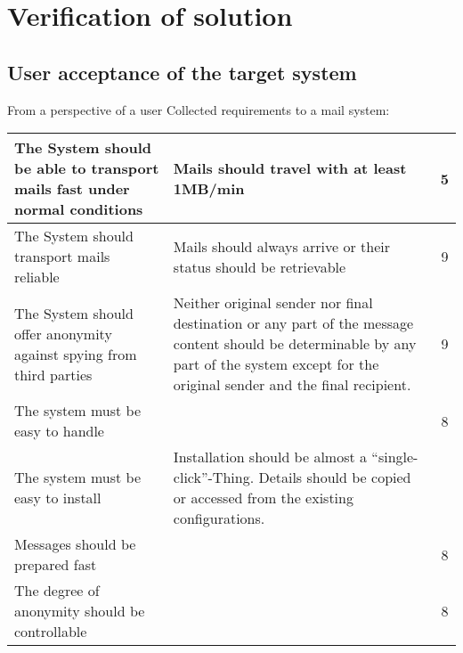 \chapter{Verification of solution}
\section{User acceptance of the target system}
From a perspective of a user 
Collected requirements to a mail system:\par
\begin{center}
\tablelasttail{\hline}
\begin{supertabular}{|p{5cm}|p{5cm}|c|}\hline
The System should be able to transport mails fast under normal conditions & Mails should travel with at least 1MB/min & 5\\\hline
The System should transport mails reliable & Mails should always arrive or their status should be retrievable & 9\\\hline
The System should offer anonymity against spying from third parties & Neither original sender nor final destination or any part of the message content should be determinable by any part of the system except for the original sender and the final recipient.& 9\\\hline
The system must be easy to handle &&8\\\hline
The system must be easy to install & Installation should be almost a ``single-click''-Thing. Details should be copied or accessed from the existing configurations.\\\hline
Messages should be prepared fast &&8\\\hline
The degree of anonymity should be controllable &  & 8\\\hline
\end{supertabular}
\end{center}

